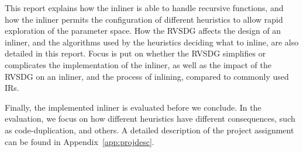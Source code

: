 
This report explains how the inliner is able to handle recursive functions, and
how the inliner permits the configuration of different heuristics to allow rapid
exploration of the parameter space. How the RVSDG affects the design of an
inliner, and the algorithms used by the heuristics deciding what to inline, are
also detailed in this report. Focus is put on whether the RVSDG simplifies or
complicates the implementation of the inliner, as well as the impact of the
RVSDG on an inliner, and the process of inlining, compared to commonly used IRs.

Finally, the implemented inliner is evaluated before we conclude. In the
evaluation, we focus on how different heuristics have different consequences,
such as code-duplication, and others. A detailed description of the project
assignment can be found in Appendix~\ref{app:projdesc}.
